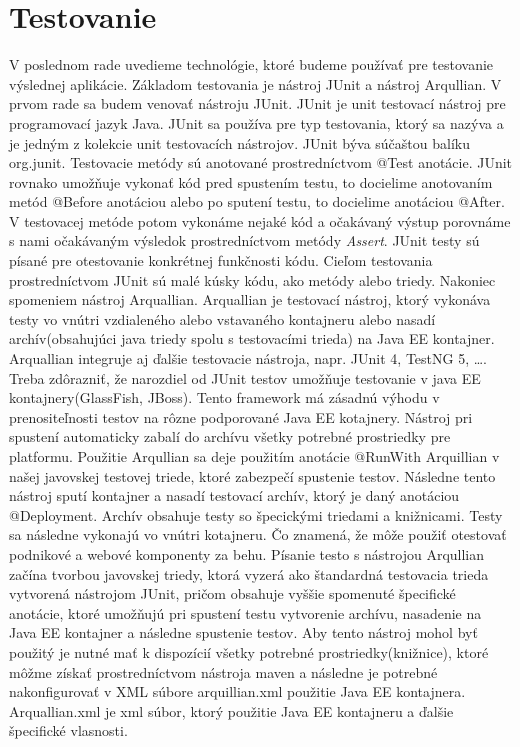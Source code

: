 \section{Testovanie}
V poslednom rade uvedieme technológie, ktoré budeme používať pre testovanie výslednej aplikácie. Základom testovania je nástroj JUnit a nástroj Arqullian.
V prvom rade sa budem venovať nástroju JUnit. JUnit je unit testovací nástroj pre programovací jazyk Java. JUnit sa používa pre typ testovania, ktorý sa nazýva \cite{testdevbook} a je jedným z kolekcie unit testovacích nástrojov. JUnit býva súčaštou balíku org.junit\cite{junitbook}. Testovacie metódy sú anotované prostredníctvom @Test anotácie. JUnit rovnako umožňuje vykonať kód pred spustením testu, to docielime anotovaním metód @Before anotáciou alebo po sputení testu, to docielime anotáciou @After. V testovacej metóde potom vykonáme nejaké kód a očakávaný výstup porovnáme s nami očakávaným výsledok prostredníctvom metódy \emph{Assert}. JUnit testy sú písané pre otestovanie konkrétnej funkčnosti kódu. Cieľom testovania prostredníctvom JUnit sú malé kúsky kódu, ako metódy alebo triedy. 
\newline \indent Nakoniec spomeniem nástroj Arquallian. Arquallian je testovací nástroj, ktorý vykonáva testy vo vnútri vzdialeného alebo vstavaného kontajneru alebo nasadí archív(obsahujúci java triedy spolu s testovacími trieda) na Java EE kontajner. Arquallian integruje aj ďalšie testovacie nástroja, napr. JUnit 4, TestNG 5, \ldots. Treba zdôrazniť, že narozdiel od JUnit testov umožňuje testovanie v java EE kontajnery(GlassFish, JBoss)\cite{arqbook}. Tento framework má zásadnú výhodu v prenositeľnosti testov na rôzne podporované Java EE kotajnery. Nástroj pri spustení automaticky zabalí do archívu všetky potrebné prostriedky pre platformu. 
\newline \indent Použitie Arqullian sa deje použitím anotácie @RunWith Arquillian v našej javovskej testovej triede, ktoré zabezpečí spustenie testov. Následne tento nástroj sputí kontajner a nasadí testovací archív, ktorý je daný anotáciou @Deployment. Archív obsahuje testy so špecickými triedami a knižnicami. Testy sa následne vykonajú vo vnútri kotajneru. Čo znamená, že môže použiť otestovať podnikové a webové komponenty za behu. Písanie testo s nástrojou Arqullian začína tvorbou javovskej triedy, ktorá vyzerá ako štandardná testovacia trieda vytvorená nástrojom JUnit, pričom obsahuje vyššie spomenuté špecifické anotácie, ktoré umožňujú pri spustení testu vytvorenie archívu, nasadenie na Java EE kontajner a následne spustenie testov.  Aby tento nástroj mohol byť použitý je nutné mať k dispozícií všetky potrebné prostriedky(knižnice), ktoré môžme získať prostredníctvom nástroja maven a následne je potrebné nakonfigurovať v XML súbore arquillian.xml použitie Java EE kontajnera. Arquallian.xml je xml súbor, ktorý použitie Java EE kontajneru a ďalšie špecifické vlasnosti.


